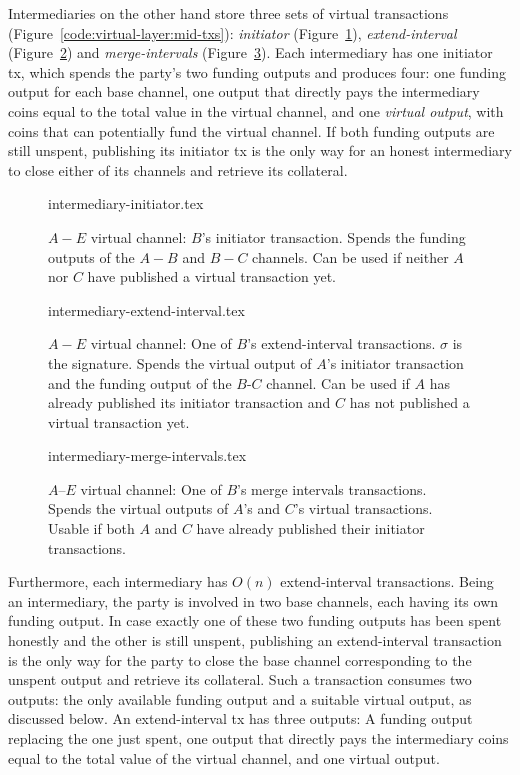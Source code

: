   Intermediaries on the other hand store three sets of virtual transactions
  (Figure~\ref{code:virtual-layer:mid-txs}): \emph{initiator}
  (Figure~\ref{figure:virtual-layer-initiator}), \emph{extend-interval}
  (Figure~\ref{figure:virtual-layer-extend-interval}) and \emph{merge-intervals}
  (Figure~\ref{figure:virtual-layer-merge-intervals}). Each intermediary has one
  initiator tx, which spends the party's two funding outputs and produces four:
  one funding output for each base channel, one output that directly pays the
  intermediary coins equal to the total value in the virtual channel, and one
  \emph{virtual output}, with coins that can potentially fund the virtual
  channel. If both funding outputs are still unspent, publishing its initiator
  tx is the only way for an honest intermediary to close either of its channels
  and retrieve its collateral.

  \begin{figure}
    {intermediary-initiator.tex}
    \caption{$A-E$ virtual channel: $B$'s initiator transaction. Spends the
    funding outputs of the $A-B$ and $B-C$ channels. Can be used if neither
    $A$ nor $C$ have published a virtual transaction yet.}
    \label{figure:virtual-layer-initiator}
  \end{figure}

  \begin{figure}
    {intermediary-extend-interval.tex}
    \caption{$A-E$ virtual channel: One of $B$'s extend-interval
    transactions. $\sigma$ is the signature. Spends the virtual output of $A$'s
    initiator transaction and the funding output of the $B$-$C$ channel. Can be
    used if $A$ has already published its initiator transaction and $C$ has not
    published a virtual transaction yet.}
    \label{figure:virtual-layer-extend-interval}
  \end{figure}

  \begin{figure}
    {intermediary-merge-intervals.tex}
    \caption{$A$--$E$ virtual channel: One of $B$'s merge intervals
    transactions. Spends the virtual outputs of $A$'s and $C$'s virtual
    transactions. Usable if both $A$ and $C$ have already published their
    initiator transactions.}
    \label{figure:virtual-layer-merge-intervals}
  \end{figure}

  Furthermore, each intermediary has $O(n)$ extend-interval transactions.
  Being an intermediary, the party is involved in two base channels, each having
  its own funding output. In case exactly one of these two funding outputs has
  been spent honestly and the other is still unspent,
  publishing an extend-interval transaction is the only way for the party to
  close the base channel corresponding to the unspent output and retrieve its
  collateral.
  Such a transaction consumes two outputs: the only
  available funding output and a suitable virtual output, as discussed below. An
  extend-interval tx has three outputs: A funding output replacing the one just
  spent, one output that directly pays the intermediary coins equal to the total
  value of the virtual channel, and one virtual output.


